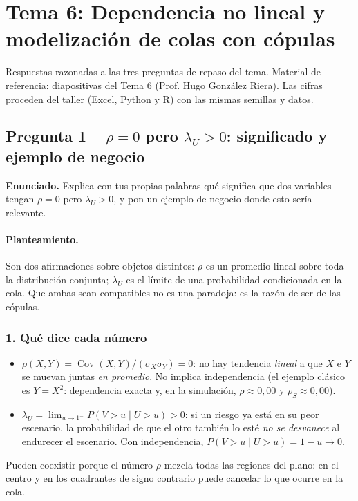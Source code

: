 \documentclass[a4paper,12pt]{article}
\begin{document}
\restoregeometry
\newpage
{}
\setcounter{page}{1}


\section{Tema 6: Dependencia no lineal y modelización de colas con cópulas}
\label{sec:tema6repaso}
\noindent
Respuestas razonadas a las tres preguntas de repaso del tema. Material de referencia: diapositivas del Tema 6 (Prof. Hugo González Riera). Las cifras proceden del taller (Excel, Python y R) con las mismas semillas y datos.

\subsection{Pregunta 1 -- $\rho=0$ pero $\lambda_U>0$: significado y ejemplo de negocio}

\noindent\textbf{Enunciado.} Explica con tus propias palabras qué significa que dos variables tengan $\rho=0$ pero $\lambda_U>0$, y pon un ejemplo de negocio donde esto sería relevante.

\paragraph{Planteamiento.} Son dos afirmaciones sobre objetos distintos: $\rho$ es un promedio lineal sobre toda la distribución conjunta; $\lambda_U$ es el límite de una probabilidad condicionada en la cola. Que ambas sean compatibles no es una paradoja: es la razón de ser de las cópulas.

\subsubsection*{1. Qué dice cada número}
\begin{itemize}[leftmargin=*,itemsep=2pt]
\item $\rho(X,Y)=\operatorname{Cov}(X,Y)/(\sigma_X\sigma_Y)=0$: no hay tendencia \emph{lineal} a que $X$ e $Y$ se muevan juntas \emph{en promedio}. No implica independencia (el ejemplo clásico es $Y=X^2$: dependencia exacta y, en la simulación, $\rho\approx0{,}00$ y $\rho_S\approx0{,}00$).
\item $\lambda_U=\lim_{u\to1^-}P(V>u\mid U>u)>0$: si un riesgo ya está en su peor escenario, la probabilidad de que el otro también lo esté \emph{no se desvanece} al endurecer el escenario. Con independencia, $P(V>u\mid U>u)=1-u\to0$.
\end{itemize}
Pueden coexistir porque el número $\rho$ mezcla todas las regiones del plano: en el centro y en los cuadrantes de signo contrario puede cancelar lo que ocurre en la cola.
\end{document}
